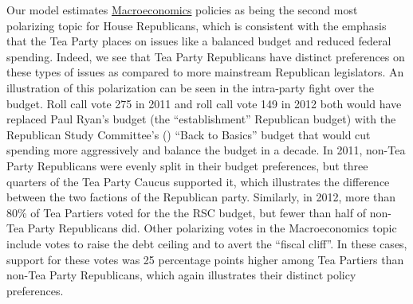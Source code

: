 Our model estimates \underline{Macroeconomics} policies as being the second most polarizing topic for House Republicans, which is consistent with the emphasis that the Tea Party places on issues like a balanced budget and reduced federal spending. Indeed, we see that Tea Party Republicans have distinct preferences on these types of issues as compared to more mainstream Republican legislators. An illustration of this polarization can be seen in the intra-party fight over the budget. Roll call vote 275 in 2011 and roll call vote 149 in 2012 both would have replaced Paul Ryan's budget (the ``establishment'' Republican budget) with the Republican Study Committee's () ``Back to Basics'' budget that would cut spending more aggressively and balance the budget in a decade. In 2011, non-Tea Party Republicans were evenly split in their budget preferences, but three quarters of the Tea Party Caucus supported it, which illustrates the difference between the two factions of the Republican party. Similarly, in 2012, more than 80\% of Tea Partiers voted for the the RSC budget, but fewer than half of non-Tea Party Republicans did. Other polarizing votes in the Macroeconomics topic include votes to raise the debt ceiling and to avert the ``fiscal cliff''. In these cases, support for these votes was 25 percentage points higher among Tea Partiers than non-Tea Party Republicans, which again illustrates their distinct policy preferences.




